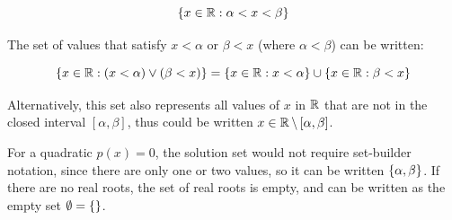        \begin{equation}
            \left\{x\in\operatorname{\mathbb{R}}:\alpha<x<\beta\right\}
        \end{equation}

        The set of values that satisfy $x<\alpha$ or $\beta<x$ (where $\alpha<\beta$) can be written:

        \begin{equation}
            \left\{x\in\operatorname{\mathbb{R}}:(x<\alpha)\vee(\beta<x)\right\}=\left\{x\in\operatorname{\mathbb{R}}:x<\alpha\right\}\cup\left\{x\in\operatorname{\mathbb{R}}:\beta<x\right\}
        \end{equation}

        Alternatively, this set also represents all values of $x$ in $\operatorname{\mathbb{R}}$ that are not in the closed interval $\left[\alpha,\beta\right]$, thus could be written $x\in\operatorname{\mathbb{R}}\setminus\left[\alpha,\beta\right]$.

        For a quadratic $p(x)=0$, the solution set would not require set-builder notation, since there are only one or two values, so it can be written $\left\{\alpha,\beta\right\}$.
        If there are no real roots, the set of real roots is empty, and can be written as the empty set $\emptyset=\left\{\right\}$.

